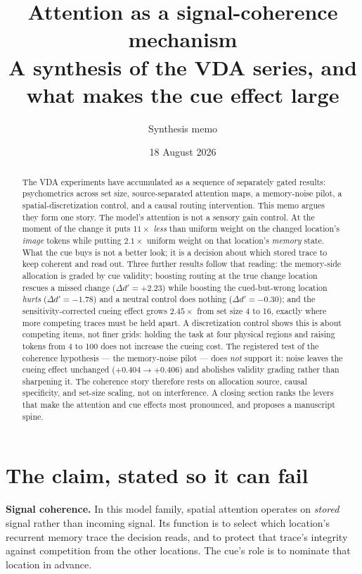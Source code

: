 \documentclass[11pt]{article}
\title{\vspace{-1.3cm}\textbf{Attention as a signal-coherence mechanism}\\[2mm]
\large A synthesis of the VDA series, and what makes the cue effect large}
\author{Synthesis memo}
\date{18 August 2026}
\newcommand{\dd}{\Delta d'}
\newcommand{\claimbox}[1]{\par\smallskip\noindent\colorbox{box}{\parbox{0.97\linewidth}{\vspace{1mm}#1\vspace{1mm}}}\par\smallskip}
\begin{document}
\maketitle
\vspace{-0.6cm}

\begin{abstract}
\noindent The VDA experiments have accumulated as a sequence of separately gated results:
psychometrics across set size, source-separated attention maps, a memory-noise pilot, a
spatial-discretization control, and a causal routing intervention. This memo argues they
form one story. The model's attention is not a sensory gain control. At the moment of the
change it puts $11\times$ \emph{less} than uniform weight on the changed location's
\emph{image} tokens while putting $2.1\times$ uniform weight on that location's
\emph{memory} state. What the cue buys is not a better look; it is a decision about which
stored trace to keep coherent and read out. Three further results follow that reading:
the memory-side allocation is graded by cue validity; boosting routing at the true change
location rescues a missed change ($\dd = +2.23$) while boosting the cued-but-wrong location
\emph{hurts} ($\dd = -1.78$) and a neutral control does nothing ($\dd = -0.30$); and the
sensitivity-corrected cueing effect grows $2.45\times$ from set size 4 to 16, exactly where
more competing traces must be held apart. A discretization control shows this is about
competing items, not finer grids: holding the task at four physical regions and raising
tokens from 4 to 100 does not increase the cueing cost. The registered test of the
coherence hypothesis --- the memory-noise pilot --- does \emph{not} support it: noise leaves
the cueing effect unchanged ($+0.404 \to +0.406$) and abolishes validity grading rather than
sharpening it. The coherence story therefore rests on allocation source, causal specificity,
and set-size scaling, not on interference. A closing section ranks the levers that make the
attention and cue effects most pronounced, and proposes a manuscript spine.
\end{abstract}

\section{The claim, stated so it can fail}

\claimbox{\textbf{Signal coherence.} In this model family, spatial attention operates on
\emph{stored} signal rather than incoming signal. Its function is to select which location's
recurrent memory trace the decision reads, and to protect that trace's integrity against
competition from the other locations. The cue's role is to nominate that location in advance.}
\end{document}

